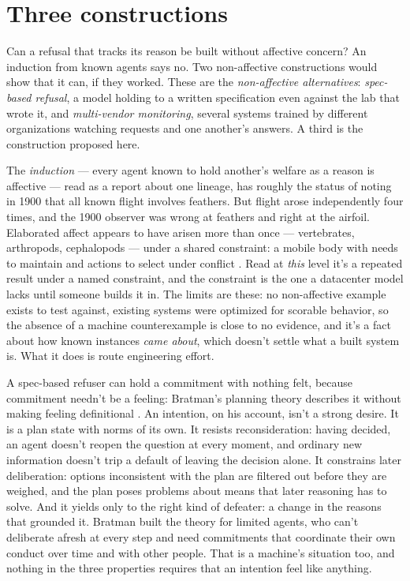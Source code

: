 \section{Three constructions}
\label{sec:21.3}
Can a refusal that tracks its reason be built without affective concern? An induction from known agents says no. Two non-affective constructions would show that it can, if they worked. These are the \emph{non-affective alternatives}: \emph{spec-based refusal}, a model holding to a written specification even against the lab that wrote it, and \emph{multi-vendor monitoring}, several systems trained by different organizations watching requests and one another's answers. A third is the construction proposed here.

The \emph{induction} — every agent known to hold another's welfare as a reason is affective — read as a report about one lineage, has roughly the status of noting in 1900 that all known flight involves feathers. But flight arose independently four times, and the 1900 observer was wrong at feathers and right at the airfoil. Elaborated affect appears to have arisen more than once — vertebrates, arthropods, cephalopods — under a shared constraint: a mobile body with needs to maintain and actions to select under conflict \autocite{feinberg2016ancient,ginsburg2019evolution,barron2016insects,godfreysmith2016other}. Read at \emph{this} level it's a repeated result under a named constraint, and the constraint is the one a datacenter model lacks until someone builds it in. The limits are these: no non-affective example exists to test against, existing systems were optimized for scorable behavior, so the absence of a machine counterexample is close to no evidence, and it's a fact about how known instances \emph{came about}, which doesn't settle what a built system is. What it does is route engineering effort.


A spec-based refuser can hold a commitment with nothing felt, because commitment needn't be a feeling: Bratman's planning theory describes it without making feeling definitional \autocite{bratman1987intention}. An intention, on his account, isn't a strong desire. It is a plan state with norms of its own. It resists reconsideration: having decided, an agent doesn't reopen the question at every moment, and ordinary new information doesn't trip a default of leaving the decision alone. It constrains later deliberation: options inconsistent with the plan are filtered out before they are weighed, and the plan poses problems about means that later reasoning has to solve. And it yields only to the right kind of defeater: a change in the reasons that grounded it. Bratman built the theory for limited agents, who can't deliberate afresh at every step and need commitments that coordinate their own conduct over time and with other people. That is a machine's situation too, and nothing in the three properties requires that an intention feel like anything.

